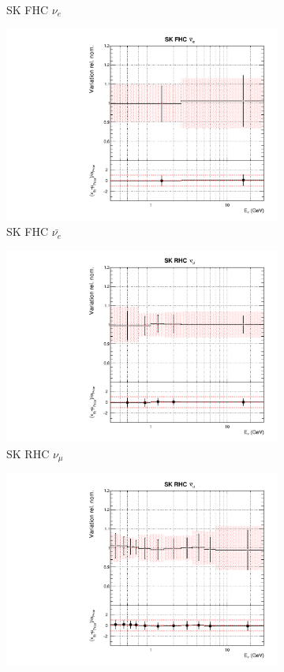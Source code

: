 \begin{figure}
\begin{subfigure}{0.45\textwidth}
  \caption{SK FHC $\nu_{e}$}
\end{subfigure}
\begin{subfigure}{0.45\textwidth}
  \centering
  \includegraphics[width=0.75\linewidth]{figs/asmvflux11}
  \caption{SK FHC $\bar{\nu_{e}}$}
\end{subfigure}
\begin{subfigure}{0.45\textwidth}
  \centering
  \includegraphics[width=0.75\linewidth]{figs/asmvflux12}
  \caption{SK RHC $\nu_{\mu}$}
\end{subfigure}
\begin{subfigure}{0.45\textwidth}
  \centering
  \includegraphics[width=0.75\linewidth]{figs/asmvflux13}

\end{subfigure}
\end{figure}
